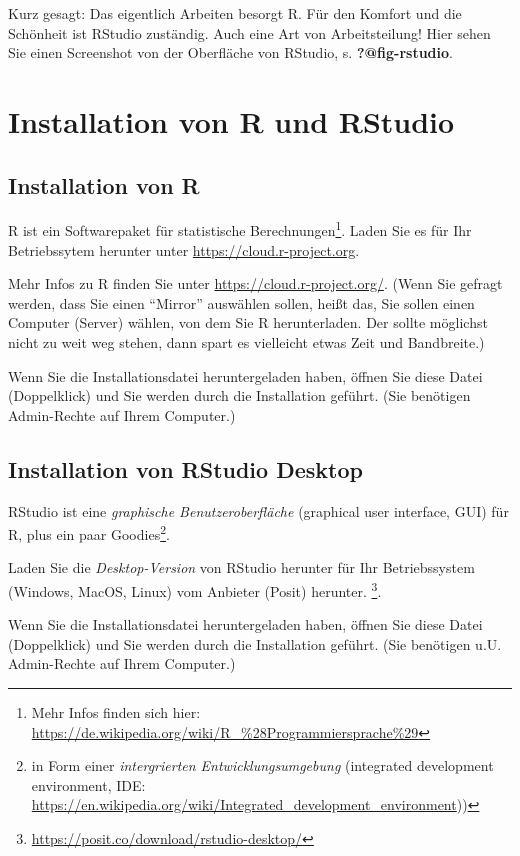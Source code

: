 \documentclass[
  a4paper,
]{scrbook}
\theoremstyle{definition}
\theoremstyle{definition}
\theoremstyle{definition}
\theoremstyle{remark}
\begin{document}
Kurz gesagt: Das eigentlich Arbeiten besorgt R. Für den Komfort und die
Schönheit ist RStudio zuständig. Auch eine Art von Arbeitsteilung! Hier
sehen Sie einen Screenshot von der Oberfläche von RStudio, s.
\textbf{?@fig-rstudio}.

\section{Installation von R und RStudio}\label{sec-install-r}

\subsection{Installation von R}\label{installation-von-r}

R ist ein Softwarepaket für statistische Berechnungen\footnote{Mehr
  Infos finden sich hier:
  \url{https://de.wikipedia.org/wiki/R_\%28Programmiersprache\%29}}.
Laden Sie es für Ihr Betriebssytem herunter unter
\url{https://cloud.r-project.org}.

Mehr Infos zu R finden Sie unter \url{https://cloud.r-project.org/}.
(Wenn Sie gefragt werden, dass Sie einen ``Mirror'' auswählen sollen,
heißt das, Sie sollen einen Computer (Server) wählen, von dem Sie R
herunterladen. Der sollte möglichst nicht zu weit weg stehen, dann spart
es vielleicht etwas Zeit und Bandbreite.)

Wenn Sie die Installationsdatei heruntergeladen haben, öffnen Sie diese
Datei (Doppelklick) und Sie werden durch die Installation geführt. (Sie
benötigen Admin-Rechte auf Ihrem Computer.)

\subsection{Installation von RStudio
Desktop}\label{installation-von-rstudio-desktop}

RStudio ist eine \emph{graphische Benutzeroberfläche} (graphical user
interface, GUI) für R, plus ein paar Goodies\footnote{in Form einer
  \emph{intergrierten Entwicklungsumgebung} (integrated development
  environment, IDE:
  \url{https://en.wikipedia.org/wiki/Integrated_development_environment}))}.

Laden Sie die \emph{Desktop-Version} von RStudio herunter für Ihr
Betriebssystem (Windows, MacOS, Linux) vom Anbieter (Posit) herunter.
\footnote{\url{https://posit.co/download/rstudio-desktop/}}.

Wenn Sie die Installationsdatei heruntergeladen haben, öffnen Sie diese
Datei (Doppelklick) und Sie werden durch die Installation geführt. (Sie
benötigen u.U. Admin-Rechte auf Ihrem Computer.)
\end{document}
